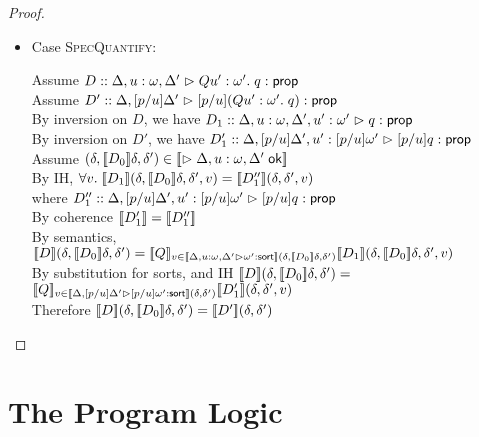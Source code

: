 \begin{proof}
\begin{enumerate}
\begin{itemize}
  \item Case \textsc{SpecQuantify}: 
    \begin{tabbedproof}
      \oo Assume $D :: \judgeA[{\Delta, u:\omega, \Delta'}]{Q u':\omega'.\; q}{\assert}$ \\
      \oo Assume $D':: \judgeA[{\Delta, [p/u]\Delta'}]{[p/u](Q u':\omega'.\;q)}{\assert}$ \\
      \ooo By inversion on $D$, we have 
            $D_1 :: \judgeA[{\Delta, u:\omega, \Delta', u':\omega'}]{q}{\assert}$ \\
      \ooo By inversion on $D'$, we have 
            $D'_1 :: \judgeA[{\Delta, [p/u]\Delta', u':[p/u]\omega'}]{[p/u]q}{\assert}$ \\
      \ooo Assume $(\delta, \interp{D_0}\delta, \delta') \in 
                   \interp{\judgeACtx{\Delta, u:\omega, \Delta'}}$ \\
      \oooo By IH, $\forall v.\; \interp{D_1}(\delta, \interp{D_0}\delta, \delta', v) = 
                    \interp{D''_1}(\delta, \delta', v)$ \\
      \oooo where $D''_1 :: \judgeA[{\Delta, [p/u]\Delta', u':[p/u]\omega'}]{[p/u]q}{\assert}$ \\
      \oooo By coherence $\interp{D'_1} = \interp{D''_1}$ \\
      \oooo By semantics, $\interp{D}(\delta, \interp{D_0}\delta, \delta') = 
                  \interp{Q}_{v \in \interp{\judgeSort[\Delta, u:\omega, \Delta']{\omega'}}(\delta, \interp{D_0}\delta, \delta')}
                      \interp{D_1}(\delta, \interp{D_0}\delta, \delta', v)$ \\
      \oooo By substitution for sorts, and IH $\interp{D}(\delta, \interp{D_0}\delta, \delta')=$\\
      \oooox $\interp{Q}_{v \in \interp{\judgeSort[{\Delta, [p/u]\Delta'}]{[p/u]\omega'}}(\delta, \delta')}
                      \interp{D'_1}(\delta, \delta', v)$ \\
      \oooo Therefore $\interp{D}(\delta, \interp{D_0}\delta, \delta') = 
                       \interp{D'}(\delta, \delta')$ \\
    \end{tabbedproof}
  \end{itemize}
\end{enumerate}
\end{proof}


\section{The Program Logic}


